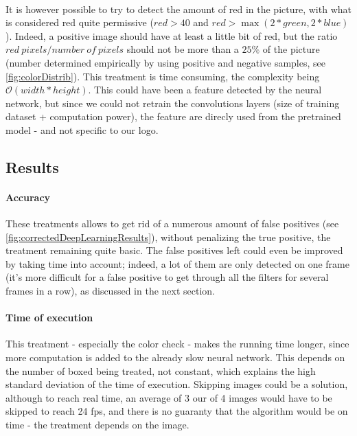 \documentclass[12pt]{article}%
\begin{document}
\paragraph{}
It is however possible to try to detect the amount of red in the picture, with what is considered red quite permissive ($red > 40$ and $red > \max(2*green, 2*blue)$). Indeed, a positive image should have at least a little bit of red, but the ratio $red\ pixels/number\ of\ pixels$ should not be more than a $25\%$ of the picture (number determined empirically by using positive and negative samples, see \ref{fig:colorDistrib}). This treatment is time consuming, the complexity being $\mathcal{O}(width*height)$. This could have been a feature detected by the neural network, but since we could not retrain the convolutions layers (size of training dataset + computation power), the feature are direcly used from the pretrained model - and not specific to our logo.

\subsection{Results}

\paragraph{Accuracy}
These treatments allows to get rid of a numerous amount of false positives (see \ref{fig:correctedDeepLearningResults}), without penalizing the true positive, the treatment remaining quite basic. The false positives left could even be improved by taking time into account; indeed, a lot of them are only detected on one frame (it's more difficult for a false positive to get through all the filters for several frames in a row), as discussed in the next section. 

\paragraph{Time of execution}
This treatment - especially the color check - makes the running time longer, since more computation is added to the already slow neural network. This depends on the number of boxed being treated, not constant, which explains the high standard deviation of the time of execution. Skipping images could be a solution, although to reach real time, an average of 3 our of 4 images would have to be skipped to reach 24 fps, and there is no guaranty that the algorithm would be on time - the treatment depends on the image.
\end{document}
